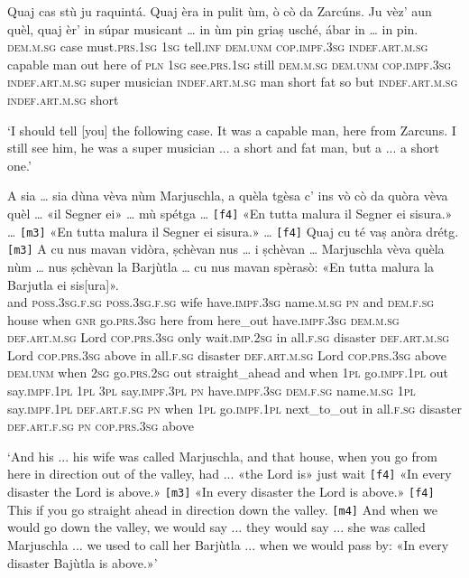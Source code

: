 \begin{linenumbers}
	\gll Quaj cas stù ju raquintá. Quaj èra in pulit ùm, ò cò da Zarcúns. Ju vèz’ aun quèl, quaj èr’ in súpar musicant … in ùm pin griaṣ usché, ábar in … in pin.\\
	\textsc{dem.m.sg} case must.\textsc{prs.1sg} \textsc{1sg} tell.\textsc{inf} \textsc{dem.unm} \textsc{cop.impf.3sg} \textsc{indef.art.m.sg} capable man out here of \textsc{pln} \textsc{1sg} see.\textsc{prs.1sg} still \textsc{dem.m.sg} \textsc{dem.unm} \textsc{cop.impf.3sg} \textsc{indef.art.m.sg} super musician {} \textsc{indef.art.m.sg} man short fat so but \textsc{indef.art.m.sg} {} \textsc{indef.art.m.sg} short\\
\end{linenumbers}
\medskip
\glt `I should tell [you] the following case. It was a capable man, here from Zarcuns. I still see him, he was a super musician ... a short and fat man, but a ... a short one.'
\medskip

\begin{linenumbers}
	\gll A sia … sia dùna vèva nùm Marjuschla, a quèla tgèsa c’ ins vò cò da quòra vèva quèl … «il Segner ei» … mù spétga … \texttt{[f4]} «En tutta malura il Segner ei sisura.»\footnotemark{} … \texttt{[m3]} «En tutta malura il Segner ei sisura.» … \texttt{[f4]} Quaj cu té vaṣ anòra drétg. \texttt{[m3]} A cu nus mavan vidòra, ṣchèvan nus … i ṣchèvan … Marjuschla vèva quèla nùm … nus ṣchèvan la Barjùtla … cu nus mavan spèrasò: «En tutta malura la Barjutla ei sis[ura]».\\
	and \textsc{poss.3sg.f.sg} {} \textsc{poss.3sg.f.sg} wife have.\textsc{impf.3sg} name.\textsc{m.sg} \textsc{pn} and \textsc{dem.f.sg} house when \textsc{gnr} go.\textsc{prs.3sg} here from here\_out have.\textsc{impf.3sg} \textsc{dem.m.sg} {} \textsc{def.art.m.sg} Lord \textsc{cop.prs.3sg} {} only wait.\textsc{imp.2sg} {} {} in all.\textsc{f.sg} disaster \textsc{def.art.m.sg} Lord \textsc{cop.prs.3sg} above {} {} in all.\textsc{f.sg} disaster \textsc{def.art.m.sg} Lord \textsc{cop.prs.3sg} above {} {} \textsc{dem.unm} when \textsc{2sg} go.\textsc{prs.2sg} out straight\_ahead {} and when \textsc{1pl} go.\textsc{impf.1pl} out say.\textsc{impf.1pl} \textsc{1pl} {} \textsc{3pl} say.\textsc{impf.3pl} {} \textsc{pn} have.\textsc{impf.3sg} \textsc{dem.f.sg} name.\textsc{m.sg} {} \textsc{1pl} say.\textsc{impf.1pl} \textsc{def.art.f.sg} \textsc{pn} {} when \textsc{1pl} go.\textsc{impf.1pl} next\_to\_out in all.\textsc{f.sg} disaster \textsc{def.art.f.sg} \textsc{pn} \textsc{cop.prs.3sg} above \\
\end{linenumbers}
\medskip
\glt `And his ... his wife was called Marjuschla, and that house, when you go from here in direction out of the valley, had ... «the Lord is» {} just wait \texttt{[f4]} «In every disaster the Lord is above.» \texttt{[m3]} «In every disaster the Lord is above.» \texttt{[f4]} This if you go straight ahead in direction down the valley. \texttt{[m4]} And when we would go down the valley, we would say ... they would say ... she was called Marjuschla ... we used to call her Barjùtla ... when we would pass by: «In every disaster Bajùtla is above.»'
\medskip

